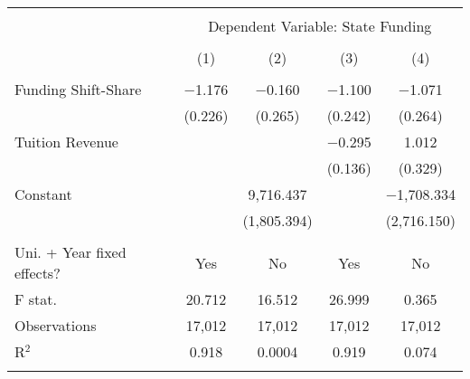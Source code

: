 
\begin{tabular}{@{\extracolsep{5pt}}lcccc} 
\\[-1.8ex]\hline 
\hline \\[-1.8ex] 
 & \multicolumn{4}{c}{Dependent Variable: State Funding} \\ 
\cline{2-5} 
\\[-1.8ex] & (1) & (2) & (3) & (4)\\ 
\hline \\[-1.8ex] 
 Funding Shift-Share & $-$1.176 & $-$0.160 & $-$1.100 & $-$1.071 \\ 
  & (0.226) & (0.265) & (0.242) & (0.264) \\ 
  Tuition Revenue &  &  & $-$0.295 & 1.012 \\ 
  &  &  & (0.136) & (0.329) \\ 
  Constant &  & 9,716.437 &  & $-$1,708.334 \\ 
  &  & (1,805.394) &  & (2,716.150) \\ 
 \hline \\[-1.8ex] 
Uni. + Year fixed effects? & Yes & No & Yes & No \\ 
F stat. & 20.712 & 16.512 & 26.999 & 0.365 \\ 
Observations & 17,012 & 17,012 & 17,012 & 17,012 \\ 
R$^{2}$ & 0.918 & 0.0004 & 0.919 & 0.074 \\ 
\hline 
\hline \\[-1.8ex] 
\end{tabular} 
